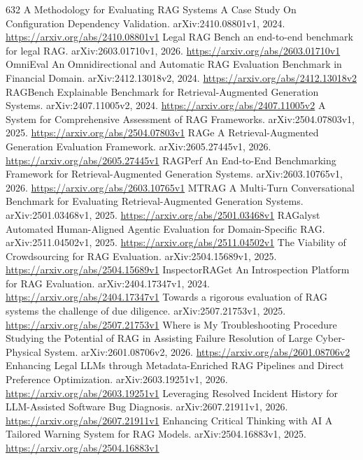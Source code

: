 \documentclass[11pt]{article}
\begin{document}
\begin{thebibliography}{632}
 A Methodology for Evaluating RAG Systems A Case Study On Configuration Dependency Validation. arXiv:2410.08801v1, 2024. \url{https://arxiv.org/abs/2410.08801v1}
 Legal RAG Bench an end-to-end benchmark for legal RAG. arXiv:2603.01710v1, 2026. \url{https://arxiv.org/abs/2603.01710v1}
 OmniEval An Omnidirectional and Automatic RAG Evaluation Benchmark in Financial Domain. arXiv:2412.13018v2, 2024. \url{https://arxiv.org/abs/2412.13018v2}
 RAGBench Explainable Benchmark for Retrieval-Augmented Generation Systems. arXiv:2407.11005v2, 2024. \url{https://arxiv.org/abs/2407.11005v2}
 A System for Comprehensive Assessment of RAG Frameworks. arXiv:2504.07803v1, 2025. \url{https://arxiv.org/abs/2504.07803v1}
 RAGe A Retrieval-Augmented Generation Evaluation Framework. arXiv:2605.27445v1, 2026. \url{https://arxiv.org/abs/2605.27445v1}
 RAGPerf An End-to-End Benchmarking Framework for Retrieval-Augmented Generation Systems. arXiv:2603.10765v1, 2026. \url{https://arxiv.org/abs/2603.10765v1}
 MTRAG A Multi-Turn Conversational Benchmark for Evaluating Retrieval-Augmented Generation Systems. arXiv:2501.03468v1, 2025. \url{https://arxiv.org/abs/2501.03468v1}
 RAGalyst Automated Human-Aligned Agentic Evaluation for Domain-Specific RAG. arXiv:2511.04502v1, 2025. \url{https://arxiv.org/abs/2511.04502v1}
 The Viability of Crowdsourcing for RAG Evaluation. arXiv:2504.15689v1, 2025. \url{https://arxiv.org/abs/2504.15689v1}
 InspectorRAGet An Introspection Platform for RAG Evaluation. arXiv:2404.17347v1, 2024. \url{https://arxiv.org/abs/2404.17347v1}
 Towards a rigorous evaluation of RAG systems the challenge of due diligence. arXiv:2507.21753v1, 2025. \url{https://arxiv.org/abs/2507.21753v1}
 Where is My Troubleshooting Procedure Studying the Potential of RAG in Assisting Failure Resolution of Large Cyber-Physical System. arXiv:2601.08706v2, 2026. \url{https://arxiv.org/abs/2601.08706v2}
 Enhancing Legal LLMs through Metadata-Enriched RAG Pipelines and Direct Preference Optimization. arXiv:2603.19251v1, 2026. \url{https://arxiv.org/abs/2603.19251v1}
 Leveraging Resolved Incident History for LLM-Assisted Software Bug Diagnosis. arXiv:2607.21911v1, 2026. \url{https://arxiv.org/abs/2607.21911v1}
 Enhancing Critical Thinking with AI A Tailored Warning System for RAG Models. arXiv:2504.16883v1, 2025. \url{https://arxiv.org/abs/2504.16883v1}

\end{thebibliography}
\end{document}
